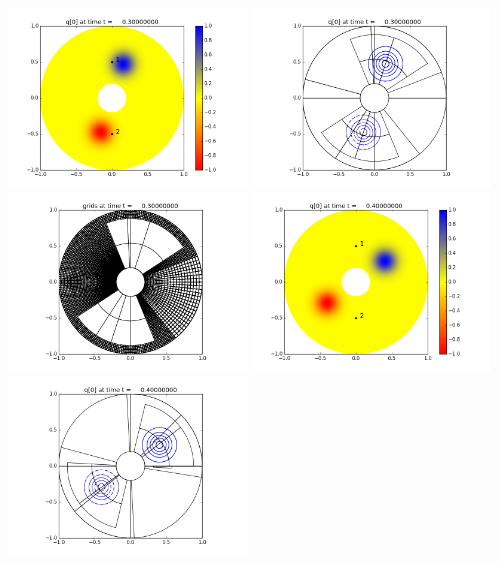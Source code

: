 \documentclass[11pt]{article}
\begin{document}
\vskip 10pt 
\includegraphics[width=0.475\textwidth]{frame0003fig0.png}
\includegraphics[width=0.475\textwidth]{frame0003fig1.png}
\vskip 10pt 
\includegraphics[width=0.475\textwidth]{frame0003fig2.png}
\vskip 10pt 
\includegraphics[width=0.475\textwidth]{frame0004fig0.png}
\includegraphics[width=0.475\textwidth]{frame0004fig1.png}
\end{document}
